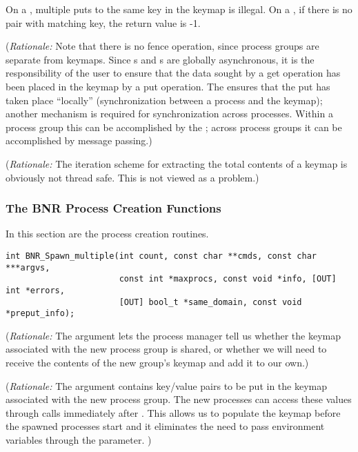 \documentclass{article}
\begin{document}
On a , multiple puts to the same key in the keymap is illegal.
On a , if there is no pair with matching key, the return value is -1.

({\em Rationale:\/}  Note that there is no fence operation, since process
groups are separate from keymaps.  Since s and s
are globally asynchronous, it is the responsibility of the user to ensure that
the data sought by a get operation has been placed in the keymap by a put
operation.  The  ensures that the put has taken place
``locally'' (synchronization between a process and the keymap); 
another mechanism is required for synchronization across processes.  Within
a process group this can be accomplished by the ; across
process groups it can be accomplished by message passing.)

({\em Rationale:\/}  The iteration scheme for extracting the total contents
of a keymap is obviously not thread safe.  This is not viewed as a problem.)

\subsubsection{The BNR Process Creation Functions}
\label{sec:bnr-spawn}

In this section are the process creation routines.

\begin{verbatim}
int BNR_Spawn_multiple(int count, const char **cmds, const char ***argvs, 
                       const int *maxprocs, const void *info, [OUT] int *errors, 
                       [OUT] bool_t *same_domain, const void *preput_info);
\end{verbatim}

({\em Rationale:\/}  The  argument lets the process manager
tell us whether the keymap associated with the new process group is shared,
or whether we will need to receive the contents of the new group's keymap
and add it to our own.)

({\em Rationale:\/}  The  argument contains key/value pairs
to be put in the keymap associated with the new process group.  The new processes
can access these values through  calls immediately after
.  This allows us to populate the keymap before the spawned 
processes start and it eliminates the need to pass environment variables through
the  parameter.
)
\end{document}
